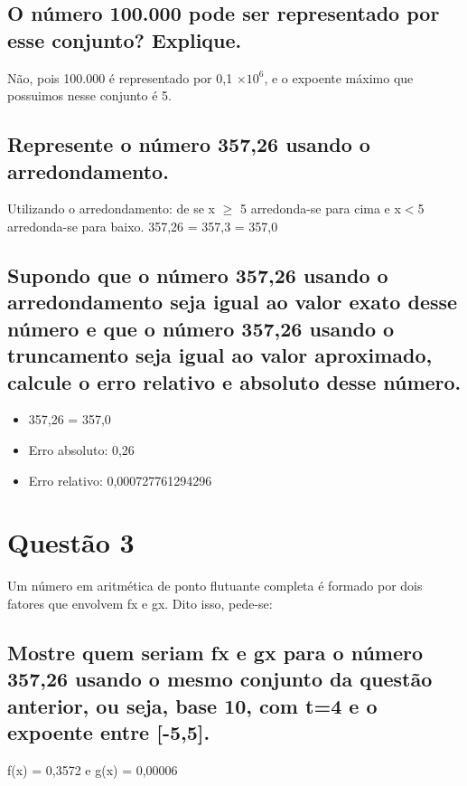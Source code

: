 \documentclass{article}
\begin{document}
\subsection{O número 100.000 pode ser representado por esse conjunto? Explique.}
Não, pois 100.000 é representado por 0,1 $\times 10^6$, e o expoente máximo que possuimos nesse conjunto é 5.
\subsection{Represente o número 357,26 usando o arredondamento.}
Utilizando o arredondamento: de se x $\geq$ 5 arredonda-se para cima e x$<$5 arredonda-se para baixo.
357,26 = 357,3 = 357,0
\subsection{Supondo que o número 357,26 usando o arredondamento seja igual ao valor exato desse
número e que o número 357,26 usando o truncamento seja igual ao valor aproximado,
calcule o erro relativo e absoluto desse número.}

\begin{itemize}
    \item 357,26 = 357,0
    \item Erro absoluto: 0,26
    \item Erro relativo: 0,000727761294296
\end{itemize}
\section{Questão 3}
Um número em aritmética de ponto flutuante completa é formado por dois fatores que
envolvem fx e gx. Dito isso, pede-se:
\subsection{Mostre quem seriam fx e gx para o número 357,26 usando o mesmo conjunto da questão
anterior, ou seja, base 10, com t=4 e o expoente entre [-5,5].}
f(x) = 0,3572 e g(x) = 0,00006
\end{document}
